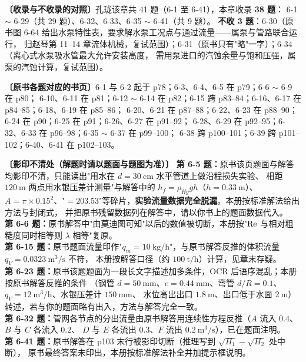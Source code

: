 \begin{tishi}
\textbf{〔收录与不收录的对照〕}孔珑该章共 41 题（6-1 至 6-41），本章收录 \textbf{38 题}：
6-1 $\sim$ 6-29（共 29 题）、6-32、6-33、6-35 $\sim$ 6-41（共 9 题）。
\textbf{不收 3 题}：6-30（原书图 6-64 给出水泵特性表，要求解水泵工况点与通过流量——属泵与管路联合运行，
归赵琴第 11--14 章流体机械，复试范围）；6-31（原书只有"略"一字）；6-34（离心式水泵吸水管最大允许安装高度，
需用泵进口的汽蚀余量与饱和压强，属泵的汽蚀计算，复试范围）。

\textbf{〔原书各题对应的书页〕}6-1 与 6-2 起于 p78；6-3、6-4、6-5 在 p79；6-6 $\sim$ 6-9 在 p80；
6-10、6-11 在 p81；6-12 $\sim$ 6-14 在 p82；6-15 跨 p83--84；6-16、6-17 在 p84--85；6-18、6-19 在 p85--86；
6-20、6-21 在 p87--88；6-22、6-23 在 p88--90；6-24 在 p90；6-25 在 p91；6-26、6-27 在 p91--92；
6-28、6-29 在 p92--95；6-32、6-33 在 p96--98；6-35 $\sim$ 6-37 在 p99--100；
6-38 跨 p100--101；6-39 跨 p101--102；6-40、6-41 在 p102--103。

\textbf{〔影印不清处（解题时请以题面与题图为准）〕}
\textbf{第 6-5 题：}原书该页题面与解答均影印不清，只能读出"用水在 $d=30\ \mathrm{cm}$ 水平管道上做沿程损失实验、
相距 $120\ \mathrm{m}$ 两点用水银压差计测量"与解答中的 $h_f=\rho_{Hg}gh$（$h=0.33\ \mathrm{m}$）、
$A=\pi\times0.15^2$、"$=203.53$"等碎片，\textbf{实验流量数据完全脱漏}。本册按标准解法给出方法与封闭式，
并把原书残留数据列在解答中，请以你书上的题面数据代入。\\
\textbf{第 6-6 题：}原书解答中"由莫迪图可知"以后的数值被切断，本册按"$\mathrm{Re}$ 与相对粗糙度同时相等则 $\lambda$ 相等"复原。\\
\textbf{第 6-15 题：}原书题面流量印作"$q_m=10\ \mathrm{kg/h}$"，与原书解答反推的体积流量 $q_V=0.0323\ \mathrm{m^3/s}$ 不符，
本册按解答口径（约 $100\ \mathrm{t/h}$）计算，见章末存疑。\\
\textbf{第 6-23 题：}原书该题题面为一段长文字描述加多条件，OCR 后语序混乱；本册按原书解答反推的条件
（钢管 $d=50\ \mathrm{mm}$、$e=0.44\ \mathrm{mm}$、弯管 $d/R=0.1$、$q_V=12\ \mathrm{m^3/h}$、水银压差计 $150\ \mathrm{mm}$、
水位高出出口 $1.8\ \mathrm{m}$、出口低于水面 $2\ \mathrm{m}$）转述，若与你的题面略有出入，方法与解答完全一致。\\
\textbf{第 6-32 题：}管网各节点的分出流量由原书解答用连续性方程反推（$A$ 流入 $0.4$、$B$ 与 $C$ 各流入 $0.2$、
$D$ 与 $E$ 各流出 $0.3$、$F$ 流出 $0.2\ \mathrm{m^3/s}$），已在题面注明。\\
\textbf{第 6-41 题：}原书解答在 p103 末行被影印切断（推理写到 $\sqrt{H_1}-\sqrt{H_2}$ 处中断），
原书最终答案未印出，本册按标准解法补全并加提示框说明。
\end{tishi}

